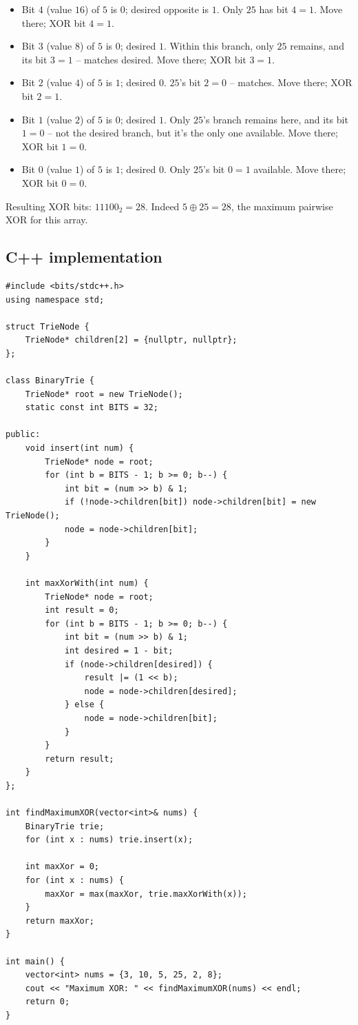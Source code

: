 \begin{itemize}
  \item Bit $4$ (value $16$) of $5$ is $0$; desired opposite is $1$. Only
        $25$ has bit $4=1$. Move there; XOR bit $4=1$.
  \item Bit $3$ (value $8$) of $5$ is $0$; desired $1$. Within this
        branch, only $25$ remains, and its bit $3=1$ -- matches desired.
        Move there; XOR bit $3=1$.
  \item Bit $2$ (value $4$) of $5$ is $1$; desired $0$. $25$'s bit
        $2=0$ -- matches. Move there; XOR bit $2=1$.
  \item Bit $1$ (value $2$) of $5$ is $0$; desired $1$. Only $25$'s
        branch remains here, and its bit $1=0$ -- not the desired
        branch, but it's the only one available. Move there; XOR bit
        $1=0$.
  \item Bit $0$ (value $1$) of $5$ is $1$; desired $0$. Only $25$'s
        bit $0=1$ available. Move there; XOR bit $0=0$.
\end{itemize}

Resulting XOR bits: $11100_2 = 28$. Indeed $5 \oplus 25 = 28$, the
maximum pairwise XOR for this array.

\subsection*{C++ implementation}

\begin{lstlisting}
#include <bits/stdc++.h>
using namespace std;

struct TrieNode {
    TrieNode* children[2] = {nullptr, nullptr};
};

class BinaryTrie {
    TrieNode* root = new TrieNode();
    static const int BITS = 32;

public:
    void insert(int num) {
        TrieNode* node = root;
        for (int b = BITS - 1; b >= 0; b--) {
            int bit = (num >> b) & 1;
            if (!node->children[bit]) node->children[bit] = new TrieNode();
            node = node->children[bit];
        }
    }

    int maxXorWith(int num) {
        TrieNode* node = root;
        int result = 0;
        for (int b = BITS - 1; b >= 0; b--) {
            int bit = (num >> b) & 1;
            int desired = 1 - bit;
            if (node->children[desired]) {
                result |= (1 << b);
                node = node->children[desired];
            } else {
                node = node->children[bit];
            }
        }
        return result;
    }
};

int findMaximumXOR(vector<int>& nums) {
    BinaryTrie trie;
    for (int x : nums) trie.insert(x);

    int maxXor = 0;
    for (int x : nums) {
        maxXor = max(maxXor, trie.maxXorWith(x));
    }
    return maxXor;
}

int main() {
    vector<int> nums = {3, 10, 5, 25, 2, 8};
    cout << "Maximum XOR: " << findMaximumXOR(nums) << endl;
    return 0;
}
\end{lstlisting}

